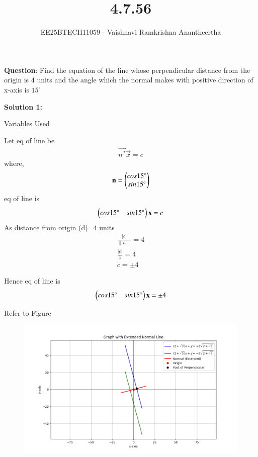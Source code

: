 \documentclass[journal]{IEEEtran}
\title{4.7.56}
\author{EE25BTECH11059 - Vaishnavi Ramkrishna Anantheertha}
\begin{document}
\maketitle

\renewcommand{\thefigure}{\theenumi}
\renewcommand{\thetable}{\theenumi}


\textbf{Question}:
Find the equation of the line whose perpendicular distance from the origin is $4$ units and the angle which the normal makes with positive direction of x-axis is $15^\circ$

\textbf{Solution 1: }
\begin{table}[H]    
  \centering
  
  \caption{Variables Used}
  \label{tab:4.7.56}
\end{table}

Let eq of line be
\begin{align}
\vec{n^T}\vec{x}=c
\end{align}
where,
\begin{align}
\mathbf{n}=\begin{pmatrix}cos 15^\circ
               \\
               sin 15^\circ\end{pmatrix}
\end{align}
 eq of line is
\begin{align}
\begin{pmatrix}cos 15^\circ & sin 15^\circ\end{pmatrix}
\mathbf{x}
=c\\
\end{align}
As distance from origin (d)=$4$ units
\begin{align}
    \frac{|c|}{\|n\|}=4\\
    \frac{|c|}{1}=4\\
    c=\pm 4
\end{align}   


Hence eq of line is 
\begin{align}
\begin{pmatrix}cos 15^\circ & sin 15^\circ\end{pmatrix}
\mathbf{x}
=\pm4
\end{align}

Refer to Figure

\begin{figure}[H]
\begin{center}
\includegraphics[width=0.6\columnwidth]{figs/graph7.png}
\end{center}
\caption{}
\label{fig:Fig}
\end{figure}
\end{document}
